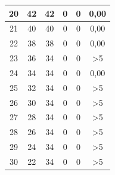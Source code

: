 \begin{longtable}{|c|c|c|c|c|c|}
	20                                           & 42                     & 42                    & 0                     & 0                      & 0,00                                               \\ \hline
	21                                           & 40                     & 40                    & 0                     & 0                      & 0,00                                               \\ \hline
	22                                           & 38                     & 38                    & 0                     & 0                      & 0,00                                               \\ \hline
	23                                           & 36                     & 34                    & 0                     & 0                      & >5                                               \\ \hline
	24                                           & 34                     & 34                    & 0                     & 0                      & 0,00                                               \\ \hline
	25                                           & 32                     & 34                    & 0                     & 0                      & >5                                               \\ \hline
	26                                           & 30                     & 34                    & 0                     & 0                      & >5                                              \\ \hline
	27                                           & 28                     & 34                    & 0                     & 0                      & >5                                              \\ \hline
	28                                           & 26                     & 34                    & 0                     & 0                      & >5                                              \\ \hline
	29                                           & 24                     & 34                    & 0                     & 0                      & >5                                              \\ \hline
	30                                           & 22                     & 34                    & 0                     & 0                      & >5                                              \\ \hline

\end{longtable}
